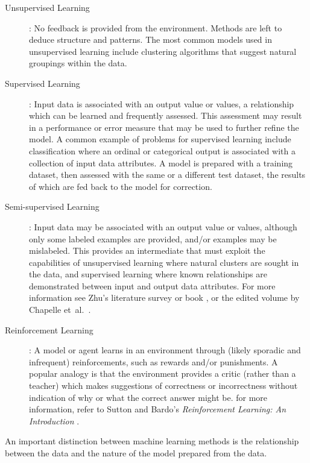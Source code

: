 \begin{description}
	\item[Unsupervised Learning]: No feedback is provided from the environment. Methods are left to deduce structure and patterns. The most common models used in unsupervised learning include clustering algorithms that suggest natural groupings within the data.
	
	\item[Supervised Learning]: Input data is associated with an output value or values, a relationship which can be learned and frequently assessed. This assessment may result in a performance or error measure that may be used to further refine the model. A common example of problems for supervised learning include classification where an ordinal or categorical output is associated with a collection of input data attributes. A model is prepared with a training dataset, then assessed with the same or a different test dataset, the results of which are fed back to the model for correction.
	
	\item[Semi-supervised Learning]: Input data may be associated with an output value or values, although only some labeled examples are provided, and/or examples may be mislabeled. This provides an intermediate that must exploit the capabilities of unsupervised learning where natural clusters are sought in the data, and supervised learning where known relationships are demonstrated between input and output data attributes. For more information see Zhu's literature survey \cite{Zhu2008} or book \cite{Zhu2009}, or the edited volume by Chapelle et~al.\ \cite{Chapelle2010}.
	
	\item[Reinforcement Learning]: A model or agent learns in an environment through (likely sporadic and infrequent) reinforcements, such as rewards and/or punishments. A popular analogy is that the environment provides a critic (rather than a teacher) which makes suggestions of correctness or incorrectness without indication of why or what the correct answer might be. for more information, refer to Sutton and Bardo's \emph{Reinforcement Learning: An Introduction} \cite{Sutton1998}.
\end{description}

An important distinction between machine learning methods is the relationship between the data and the nature of the model prepared from the data.

